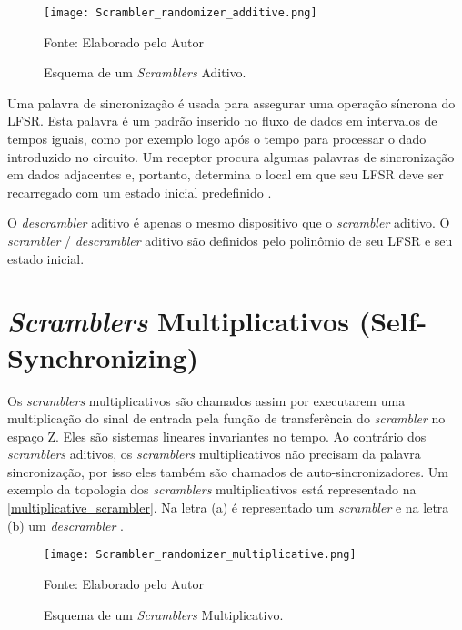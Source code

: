 \begin{figure}[H]
	\caption{\label{additive_scrambler}Esquema de um \textit{Scramblers} Aditivo.}
	\centering
	\texttt{[image: Scrambler\_randomizer\_additive.png]}
	\begin{center}
		Fonte: Elaborado pelo Autor
	\end{center}	
\end{figure}

Uma palavra de sincronização é usada para assegurar uma operação síncrona do LFSR. Esta palavra é um padrão inserido no fluxo de dados em intervalos de tempos iguais, como por exemplo logo após o tempo para processar o dado introduzido no circuito. Um receptor procura algumas palavras de sincronização em dados adjacentes e, portanto, determina o local em que seu LFSR deve ser recarregado com um estado inicial predefinido \cite{Ghassan2018}.

O \textit{descrambler} aditivo é apenas o mesmo dispositivo que o \textit{scrambler} aditivo. O \textit{scrambler} /  \textit{descrambler} aditivo são definidos pelo polinômio de seu LFSR e seu estado inicial.

\section{\textit{Scramblers} Multiplicativos (Self-Synchronizing)} \label{scrambler_multi}

Os \textit{scramblers} multiplicativos são chamados assim por executarem uma multiplicação do sinal de entrada pela função de transferência do \textit{scrambler} no espaço Z. Eles são sistemas lineares invariantes no tempo. Ao contrário dos \textit{scramblers} aditivos, os \textit{scramblers} multiplicativos não precisam da palavra sincronização, por isso eles também são chamados de auto-sincronizadores.  Um exemplo da topologia dos \textit{scramblers} multiplicativos está representado na \autoref{multiplicative_scrambler}. Na letra (a) é representado um \textit{scrambler} e na letra (b) um \textit{descrambler} \cite{Ghassan2018}.

\begin{figure}[H]
	\caption{\label{multiplicative_scrambler}Esquema de um \textit{Scramblers} Multiplicativo.}
	\centering
	\texttt{[image: Scrambler\_randomizer\_multiplicative.png]}
	\begin{center}
		Fonte: Elaborado pelo Autor
	\end{center}	
\end{figure}

